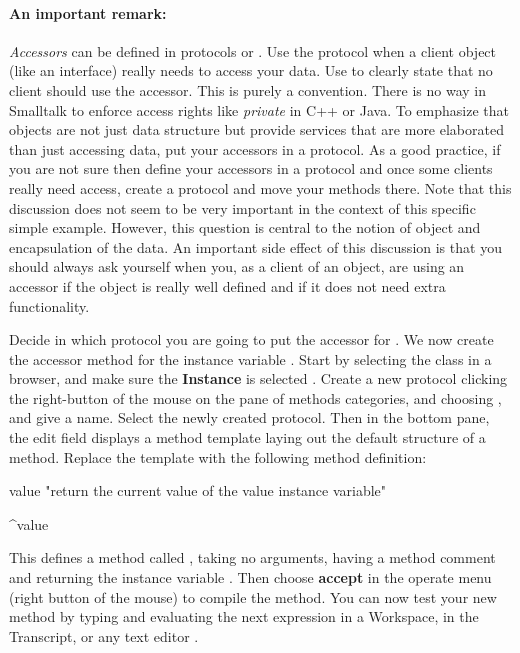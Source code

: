 \paragraph{An important remark:} \textit{Accessors} can be defined in protocols
 or .  Use the
 protocol when a client object (like an
interface) really needs to access your data. Use 
to clearly state that no client should use the accessor. This is
purely a convention. There is no way in Smalltalk to enforce
access rights like \emph{private} in C++ or Java.  To emphasize that objects are
not just data structure but provide services that are more
elaborated than just accessing data, put your accessors  in a
 protocol. As a good practice, if you are not sure
then define your accessors in a  protocol and
once some clients really need access, create
a protocol  and move your methods there. Note
that this discussion does not seem to be very important in the
context of this specific simple example. However, this question is
central to the notion of object and encapsulation of the data. An
important side effect of this discussion is that you should always
ask yourself when you, as a client of an object, are using an
accessor if the object is really well defined and if it does not
need extra functionality.

\exercise Decide in which protocol you are going to put the accessor for . We now create the accessor method for the instance variable . Start by selecting the class
 in a browser, and make sure the \textbf{Instance}
 is selected . Create a
new protocol clicking the right-button of the mouse on the pane of
methods categories, and choosing , and give a name. Select
the newly created protocol. Then in the bottom pane, the edit
field displays a method template laying out the default structure
of a method. Replace the template with the following method
definition:

\begin{scode}
value
     "return the current value of the value instance variable"

     ^value
\end{scode}

This defines a method called , taking no
arguments, having a method comment and returning the instance
variable . Then choose \textbf{accept} in the
operate menu (right button of the mouse) to compile the method. You
can now test your new method by typing and evaluating the next
expression in a Workspace, in the Transcript, or any text editor .

